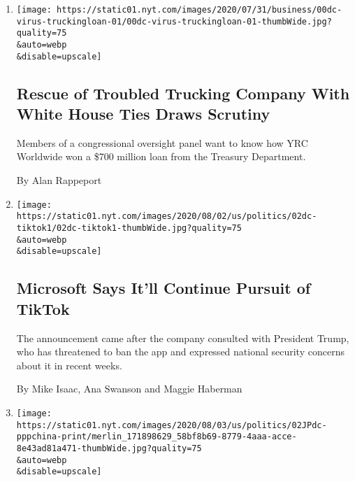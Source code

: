 \begin{enumerate}
\def\labelenumi{\arabic{enumi}.}
\item
  \href{/2020/08/03/us/politics/yrc-coronavirus-relief-funds.html}{}

  \texttt{[image: https://static01.nyt.com/images/2020/07/31/business/00dc-virus-truckingloan-01/00dc-virus-truckingloan-01-thumbWide.jpg?quality=75\\\&auto=webp\\\&disable=upscale]}

  \hypertarget{rescue-of-troubled-trucking-company-with-white-house-ties-draws-scrutiny}{%
  \subsection{Rescue of Troubled Trucking Company With White House Ties
  Draws
  Scrutiny}\label{rescue-of-troubled-trucking-company-with-white-house-ties-draws-scrutiny}}

  Members of a congressional oversight panel want to know how YRC
  Worldwide won a \$700 million loan from the Treasury Department.

  By Alan Rappeport
\item
  \href{/2020/08/02/business/economy/trump-tiktok-china-national-security.html}{}

  \texttt{[image: https://static01.nyt.com/images/2020/08/02/us/politics/02dc-tiktok1/02dc-tiktok1-thumbWide.jpg?quality=75\\\&auto=webp\\\&disable=upscale]}

  \hypertarget{microsoft-says-itll-continue-pursuit-of-tiktok}{%
  \subsection{Microsoft Says It'll Continue Pursuit of
  TikTok}\label{microsoft-says-itll-continue-pursuit-of-tiktok}}

  The announcement came after the company consulted with President
  Trump, who has threatened to ban the app and expressed national
  security concerns about it in recent weeks.

  By Mike Isaac, Ana Swanson and Maggie Haberman
\item
  \href{/2020/08/02/us/politics/virus-china-ppp-small-business-loans.html}{}

  \texttt{[image: https://static01.nyt.com/images/2020/08/03/us/politics/02JPdc-pppchina-print/merlin\_171898629\_58bf8b69-8779-4aaa-acce-8e43ad81a471-thumbWide.jpg?quality=75\\\&auto=webp\\\&disable=upscale]}

  \hypertarget{us-small-business-bailout-money-flowed-to-chinese-owned-companies}{%
}
\end{enumerate}
